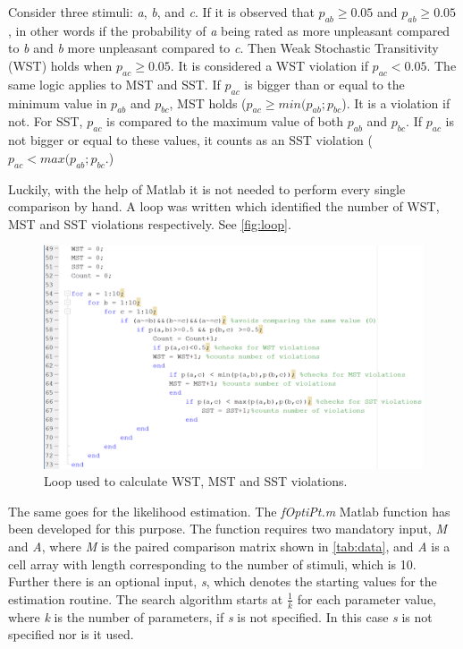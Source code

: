 \noindent
%
Consider three stimuli: \textit{a}, \textit{b}, and \textit{c}. If it is observed that $p_{ab} \geq 0.05$ and $p_{ab} \geq 0.05$, in other words if the probability of \textit{a} being rated as more unpleasant compared to \textit{b} and \textit{b} more unpleasant compared to \textit{c}. Then Weak Stochastic Transitivity (WST) holds when $p_{ac} \geq 0.05$. It is considered a WST violation if $p_{ac} < 0.05$. The same logic applies to MST and SST. If $p_{ac}$ is bigger than or equal to the minimum value in $p_{ab}$ and $p_{bc}$, MST holds ($p_{ac}\geq min(p_{ab};p_{bc}$). It is a violation if not. For SST, $p_{ac}$ is compared to the maximum value of both $p_{ab}$ and $p_{bc}$. If $p_{ac}$ is not bigger or equal to these values, it counts as an SST violation ($p_{ac}< max(p_{ab};p_{bc}$.)

Luckily, with the help of Matlab it is not needed to perform every single comparison by hand. A loop was written which identified the number of WST, MST and SST violations respectively. See \autoref{fig:loop}.
%
\begin{figure}[H]
\centering
\includegraphics[width = \textwidth]{Figure/loop.png} 
\caption{Loop used to calculate WST, MST and SST violations.}
\label{fig:loop}
\end{figure}

\noindent
%
The same goes for the likelihood estimation. The \textit{fOptiPt.m} Matlab function has been developed for this purpose. The function requires two mandatory input, \textit{M} and \textit{A}, where \textit{M} is the paired comparison matrix shown in \autoref{tab:data}, and \textit{A} is a cell array with length corresponding to the number of stimuli, which is 10. Further there is an optional input, \textit{s}, which denotes the starting values for the estimation routine. The search algorithm starts at $\frac{1}{k}$ for each parameter value, where \textit{k} is the number of parameters, if \textit{s} is not specified. In this case \textit{s} is not specified nor is it used.